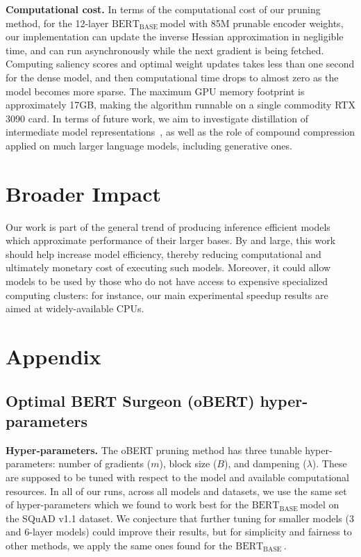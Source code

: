 \documentclass[11pt]{article}
\newcommand{\bert}{$\textrm{BERT}_{\textrm{BASE}}\,$}
\begin{document}
\noindent\textbf{Computational cost.} 
In terms of the computational cost of our pruning method, for the 12-layer \bert model with 85M prunable encoder weights, our implementation can update the inverse Hessian approximation in negligible time, and can run asynchronously while the next gradient is being fetched. 
Computing saliency scores and optimal weight updates takes less than one second for the dense model, and then computational time drops to almost zero as the model becomes more sparse. The maximum GPU memory footprint is approximately 17GB, making the algorithm runnable on a single commodity RTX 3090 card. 
In terms of future work, we  aim to investigate distillation of intermediate model representations~\cite{Wang2020MiniLMDS}, as well as the role of compound compression applied on much larger language models, including generative ones. 

\section{Broader Impact}
Our work is part of the general trend of producing inference efficient models which approximate performance of their larger bases. By and large, this work should help increase model efficiency, thereby reducing computational and ultimately monetary cost of executing such models. Moreover, it could allow models to be used by those who do not have access to expensive specialized computing clusters: for instance, our main experimental speedup results are aimed at widely-available CPUs. 





\appendix
\section{Appendix}
\label{sec:appendix}

\subsection{Optimal BERT Surgeon (oBERT) hyper-parameters}
\label{app:obs-hyperparams}
\noindent\textbf{Hyper-parameters.} The oBERT pruning method has three tunable hyper-parameters: number of gradients ($m$), block size ($B$), and dampening ($\lambda$). These are supposed to be tuned with respect to the model and available computational resources. In all of our runs, across all models and datasets, we use the same set of hyper-parameters which we found to work best for the \bert model on the SQuAD v1.1 dataset. We conjecture that further tuning for smaller models (3 and 6-layer models) could improve their results, but for simplicity and fairness to other methods, we apply the same ones found for the \bert.
\end{document}
